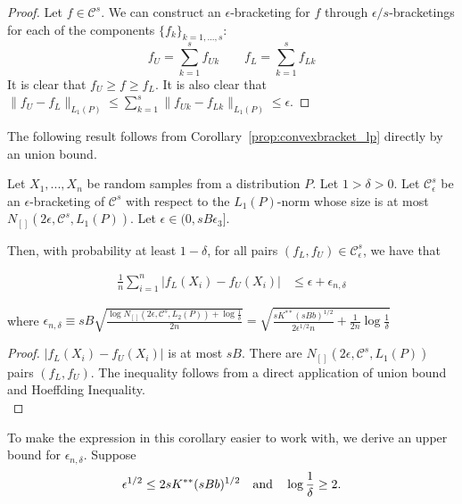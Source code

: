 \begin{proof}
Let $f \in \mathcal{C}^s$. We can construct an $\epsilon$-bracketing for $f$ through $\epsilon/s$-bracketings for each of the components $\{ f_k \}_{k=1,...,s}$:
\[f_U = \sum_{k=1}^s f_{Uk}  \qquad f_L = \sum_{k=1}^s f_{Lk} \]
It is clear that $f_U \geq f \geq f_L$. It is also clear that $\| f_U - f_L \|_{L_1(P)} \leq \sum_{k=1}^s \| f_{Uk} - f_{Lk} \|_{L_1(P)} \leq \epsilon$.
\end{proof}


The following result follows from Corollary~\ref{prop:convexbracket_lp} directly by an union bound. 

\begin{corollary}
\label{cor:convexbracket_ln}
Let $X_1,...,X_n$ be random samples from a distribution $P$. Let $1 > \delta > 0$. Let $\mathcal{C}^s_\epsilon$ be an $\epsilon$-bracketing of $\mathcal{C}^s$ with respect to the $L_1(P)$-norm whose size is at most $N_{[]}( 2\epsilon, \mathcal{C}^s, L_1(P))$. Let $\epsilon \in (0, s B \epsilon_3]$.

Then, with probability at least $1-\delta$, for all pairs $(f_L, f_U) \in \mathcal{C}^s_\epsilon$, we have that

\begin{align*}
\frac{1}{n} \sum_{i=1}^n |f_L(X_i) - f_U(X_i)| &\leq \epsilon + \epsilon_{n, \delta}
\end{align*}

where 
$\epsilon_{n,\delta} \equiv 
sB \sqrt{ \frac{ \log N_{[]}(2\epsilon, \mathcal{C}^s, L_2(P)) + \log \frac{1}{\delta}}{2n}} 
= \sqrt{ \frac{ sK^{**}(sBb)^{1/2}}{2\epsilon^{1/2}n} + \frac{1}{2n} \log \frac{1}{\delta}}$
\end{corollary}

\begin{proof}
$|f_L(X_i) - f_U(X_i)|$ is at most $sB$. There are $N_{[]}(2\epsilon, \mathcal{C}^s, L_1(P))$ pairs $(f_L, f_U)$. The inequality follows from a direct application of union bound and Hoeffding Inequality.\\
\end{proof}

To make the expression in this corollary easier to work with, we derive an upper bound for $\epsilon_{n, \delta}$. Suppose 
\begin{align}
\epsilon^{1/2} \leq 2sK^{**} (sBb)^{1/2} \quad \textrm{and} \quad \log \frac{1}{\delta} \geq 2. \label{cond:simplify_covering_number}
\end{align}

